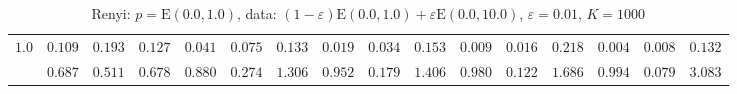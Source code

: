 \begin{table}[ht]
\begin{center}
\begin{tabular}{|c|ccc|ccc|ccc|ccc|ccc|}
\hline 
$1.0$ & $ 0.109 $ & $ 0.193 $ & $ 0.127 $ & $ 0.041 $ & $ 0.075 $ & $ 0.133 $ & $ 0.019 $ & $ 0.034 $ & $ 0.153 $ & $ 0.009 $ & $ 0.016 $ & $ 0.218 $ & $ 0.004 $ & $ 0.008 $ & $ 0.132 $\\ 
 & $ 0.687 $ & $ 0.511 $ & $ 0.678 $ & $ 0.880 $ & $ 0.274 $ & $ 1.306 $ & $ 0.952 $ & $ 0.179 $ & $ 1.406 $ & $ 0.980 $ & $ 0.122 $ & $ 1.686 $ & $ 0.994 $ & $ 0.079 $ & $ 3.083 $\\ 
\hline 
\end{tabular}
\caption{Renyi: $p = \mathrm{E}(0.0,1.0)$, data: $(1-\varepsilon)\mathrm{E}(0.0,1.0) + \varepsilon \mathrm{E}(0.0,10.0)$, $\varepsilon =  0.01$, $K = 1000$} 
\end{center}
\end{table}
